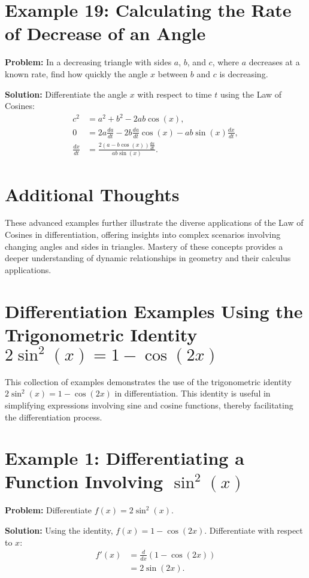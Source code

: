 \documentclass[a4paper,12pt]{book}
\newcounter{example}
\begin{document}
\section*{Example 19: Calculating the Rate of Decrease of an Angle}
\textbf{Problem:} In a decreasing triangle with sides $a$, $b$, and $c$, where $a$ decreases at a known rate, find how quickly the angle $x$ between $b$ and $c$ is decreasing.

\textbf{Solution:}
Differentiate the angle $x$ with respect to time $t$ using the Law of Cosines:
\begin{align*}
c^2 &= a^2 + b^2 - 2ab \cos(x), \\
0 &= 2a \frac{da}{dt} - 2b \frac{da}{dt} \cos(x) - ab \sin(x) \frac{dx}{dt}, \\
\frac{dx}{dt} &= \frac{2(a - b \cos(x)) \frac{da}{dt}}{ab \sin(x)}.
\end{align*}

\section*{Additional Thoughts}
These advanced examples further illustrate the diverse applications of the Law of Cosines in differentiation, offering insights into complex scenarios involving changing angles and sides in triangles. Mastery of these concepts provides a deeper understanding of dynamic relationships in geometry and their calculus applications.

\section*{Differentiation Examples Using the Trigonometric Identity \(2 \sin^2(x) = 1 - \cos(2x)\)}
This collection of examples demonstrates the use of the trigonometric identity \(2 \sin^2(x) = 1 - \cos(2x)\) in differentiation. This identity is useful in simplifying expressions involving sine and cosine functions, thereby facilitating the differentiation process.

\section*{Example 1: Differentiating a Function Involving \(\sin^2(x)\)}
\textbf{Problem:} Differentiate \(f(x) = 2 \sin^2(x)\).

\textbf{Solution:}
Using the identity, \(f(x) = 1 - \cos(2x)\). Differentiate with respect to \(x\):
\begin{align*}
f'(x) &= \frac{d}{dx}(1 - \cos(2x)) \\
&= 2 \sin(2x).
\end{align*}
\end{document}
